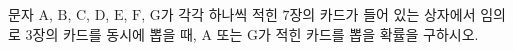 문자 $\mathrm{A}$, $\mathrm{B}$, $\mathrm{C}$, $\mathrm{D}$, $\mathrm{E}$, $\mathrm{F}$, $\mathrm{G}$가 각각 하나씩 적힌 $7$장의 카드가 들어 있는 상자에서 임의로 $3$장의 카드를 동시에 뽑을 때, $\mathrm{A}$ 또는 $\mathrm{G}$가 적힌 카드를 뽑을 확률을 구하시오.
